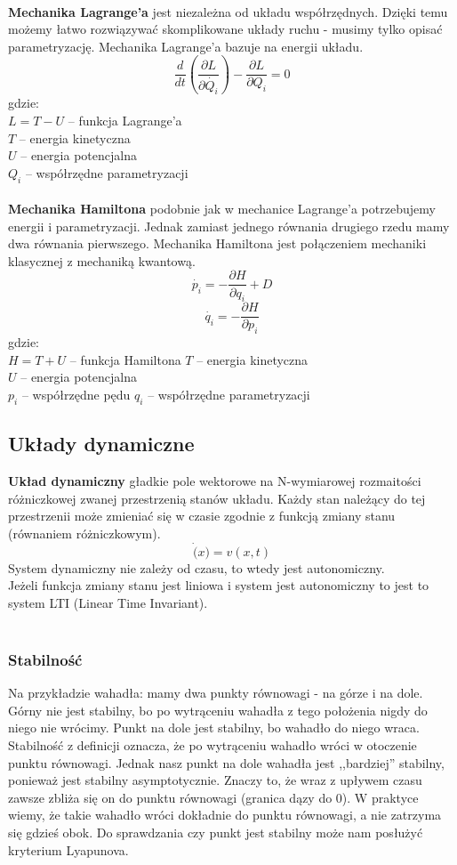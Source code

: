 \documentclass[12pt]{article}
\begin{document}
~\\
\textbf{Mechanika Lagrange'a} jest niezależna od układu współrzędnych. Dzięki temu możemy łatwo rozwiązywać skomplikowane układy ruchu - musimy tylko opisać parametryzację. Mechanika Lagrange'a bazuje na energii układu. 
$$ \dfrac{d}{dt} (\dfrac{\partial L}{\partial\dot{Q_{i}}}) - \dfrac{\partial L}{\partial Q_{i}} = 0$$
gdzie: \\
$L = T - U$ -- funkcja Lagrange'a\\
$T$ -- energia kinetyczna \\
$U$ -- energia potencjalna \\
$Q_{i}$ -- współrzędne parametryzacji\\
~\\
\textbf{Mechanika Hamiltona} podobnie jak w mechanice Lagrange'a potrzebujemy energii i parametryzacji. Jednak zamiast jednego równania drugiego rzedu mamy dwa równania pierwszego. Mechanika Hamiltona jest połączeniem mechaniki klasycznej z mechaniką kwantową.
$$ \dot{p_{i}} = - \dfrac{\partial H}{\partial q_{i}} + D $$
$$ \dot{q_{i}} = - \dfrac{\partial H}{\partial p_{i}} $$
gdzie: \\
$H = T + U $ -- funkcja Hamiltona
$T$ -- energia kinetyczna \\
$U$ -- energia potencjalna \\
$p_{i}$ -- współrzędne pędu
$q_{i}$ -- współrzędne parametryzacji

\subsection{Układy dynamiczne}
\textbf{Układ dynamiczny} gładkie pole wektorowe na N-wymiarowej rozmaitości różniczkowej zwanej przestrzenią stanów układu. Każdy stan należący do tej przestrzenii może zmieniać się w czasie zgodnie z funkcją zmiany stanu (równaniem różniczkowym). \\
$$\dot(x) = v(x,t)$$
System dynamiczny nie zależy od czasu, to wtedy jest autonomiczny. \\
Jeżeli funkcja zmiany stanu jest liniowa i system jest autonomiczny to jest to system LTI (Linear Time Invariant).\\
~\\
\subsubsection{Stabilność}
Na przykładzie wahadła: mamy dwa punkty równowagi - na górze i na dole. Górny nie jest stabilny, bo po wytrąceniu wahadła z tego położenia nigdy do niego nie wrócimy. Punkt na dole jest stabilny, bo wahadło do niego wraca. Stabilność z definicji oznacza, że po wytrąceniu wahadło wróci w otoczenie punktu równowagi. Jednak nasz punkt na dole wahadła jest ,,bardziej'' stabilny, ponieważ jest stabilny asymptotycznie. Znaczy to, że wraz z upływem czasu zawsze zbliża się on do punktu równowagi (granica dązy do 0). W praktyce wiemy, że takie wahadło wróci dokładnie do punktu równowagi, a nie zatrzyma się gdzieś obok. Do sprawdzania czy punkt jest stabilny może nam posłużyć kryterium Lyapunova.\\
\end{document}
